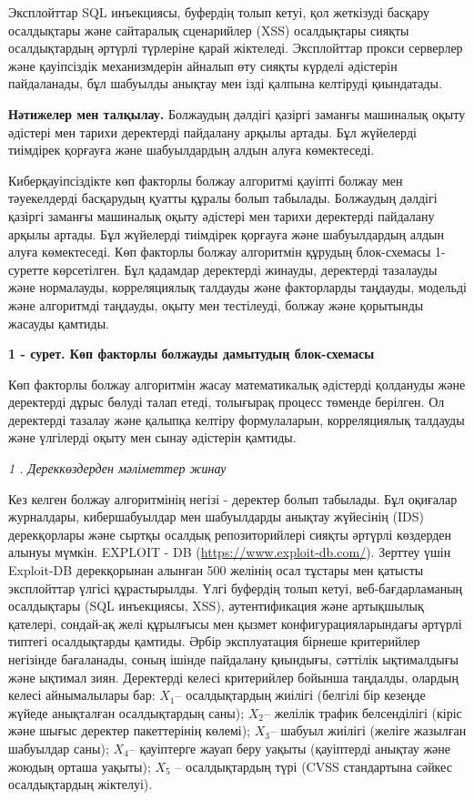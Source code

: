 \begin{multicols}{2}
Эксплойттар SQL инъекциясы, буфердің толып кетуі, қол жеткізуді басқару
осалдықтары және сайтаралық сценарийлер (XSS) осалдықтары сияқты
осалдықтардың әртүрлі түрлеріне қарай жіктеледі. Эксплойттар прокси
серверлер және қауіпсіздік механизмдерін айналып өту сияқты күрделі
әдістерін пайдаланады, бұл шабуылды анықтау мен ізді қалпына келтіруді
қиындатады.

{\bfseries Нәтижелер мен талқылау.} Болжаудың дәлдігі қазіргі заманғы
машиналық оқыту әдістері мен тарихи деректерді пайдалану арқылы артады.
Бұл жүйелерді тиімдірек қорғауға және шабуылдардың алдын алуға
көмектеседі.

Киберқауіпсіздікте көп факторлы болжау алгоритмі қауіпті болжау мен
тәуекелдерді басқарудың қуатты құралы болып табылады. Болжаудың дәлдігі
қазіргі заманғы машиналық оқыту әдістері мен тарихи деректерді пайдалану
арқылы артады. Бұл жүйелерді тиімдірек қорғауға және шабуылдардың алдын
алуға көмектеседі. Көп факторлы болжау алгоритмін құрудың блок-схемасы
1-суретте көрсетілген. Бұл қадамдар деректерді жинауды, деректерді
тазалауды және нормалауды, корреляциялық талдауды және факторларды
таңдауды, модельді және алгоритмді таңдауды, оқыту мен тестілеуді,
болжау және қорытынды жасауды қамтиды.
\end{multicols}

{\bfseries 1 - сурет. Көп факторлы болжауды дамытудың блок-схемасы}

Көп факторлы болжау алгоритмін жасау математикалық әдістерді қолдануды
және деректерді дұрыс бөлуді талап етеді, толығырақ процесс төменде
берілген. Ол деректерді тазалау және қалыпқа келтіру формулаларын,
корреляциялық талдауды және үлгілерді оқыту мен сынау әдістерін қамтиды.

\emph{1 . Дереккөздерден мәліметтер жинау}

Кез келген болжау алгоритмінің негізі - деректер болып табылады. Бұл
оқиғалар журналдары, кибершабуылдар мен шабуылдарды анықтау жүйесінің
(IDS) дерекқорлары және сыртқы осалдық репозиторийлері сияқты әртүрлі
көздерден алынуы мүмкін. EXPLOIT - DB
(\href{https://www.exploit-db.com/\%20}{https://www.exploit-db.com/}).
Зерттеу үшін Exploit-DB дерекқорынан алынған 500 желінің осал тұстары
мен қатысты эксплойттар үлгісі құрастырылды. Үлгі буфердің толып кетуі,
веб-бағдарламаның осалдықтары (SQL инъекциясы, XSS), аутентификация және
артықшылық қателері, сондай-ақ желі құрылғысы мен қызмет
конфигурацияларындағы әртүрлі типтегі осалдықтарды қамтиды. Әрбір
эксплуатация бірнеше критерийлер негізінде бағаланады, соның ішінде
пайдалану қиындығы, сәттілік ықтималдығы және ықтимал зиян. Деректерді
келесі критерийлер бойынша таңдалды, олардың келесі айнымалылары бар:
\(X_{1}\)-- осалдықтардың жиілігі (белгілі бір кезеңде жүйеде анықталған
осалдықтардың саны); \(X_{2}\)-- желілік трафик белсенділігі (кіріс және
шығыс деректер пакеттерінің көлемі); \(X_{3}\)-- шабуыл жиілігі (желіге
жазылған шабуылдар саны); \(X_{4}\)-- қауіптерге жауап беру уақыты
(қауіптерді анықтау және жоюдың орташа уақыты); \(X_{5}\) --
осалдықтардың түрі (CVSS стандартына сәйкес осалдықтардың жіктелуі).


